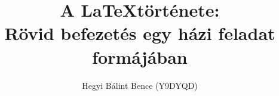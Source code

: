 
\title{A \LaTeX története:\\Rövid befezetés egy házi feladat formájában}
\author{\foreignlanguage{hungarian}{Hegyi Bálint Bence (Y9DYQD)}}